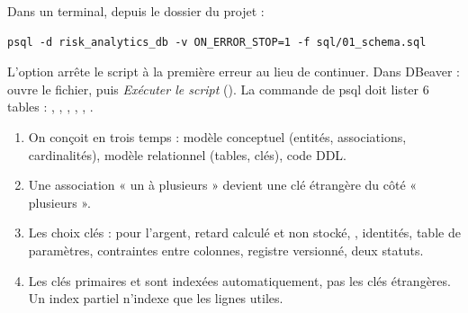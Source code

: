 \begin{resultat}
Dans un terminal, depuis le dossier du projet :
\begin{lstlisting}[style=shell]
psql -d risk_analytics_db -v ON_ERROR_STOP=1 -f sql/01_schema.sql
\end{lstlisting}
L'option  arrête le script à la première erreur au lieu de continuer. Dans
DBeaver : ouvre le fichier, puis \emph{Exécuter le script} (). La commande \code{\dt} de
psql doit lister 6 tables : , , ,
, , .
\end{resultat}

\begin{resume}
\begin{enumerate}
\item On conçoit en trois temps : modèle conceptuel (entités, associations, cardinalités), modèle
relationnel (tables, clés), code DDL.
\item Une association « un à plusieurs » devient une clé étrangère du côté « plusieurs ».
\item Les choix clés :  pour l'argent, retard calculé et non stocké, , identités, table de paramètres, contraintes entre colonnes, registre versionné, deux statuts.
\item Les clés primaires et  sont indexées automatiquement, pas les clés étrangères. Un
index partiel n'indexe que les lignes utiles.
\end{enumerate}
\end{resume}
